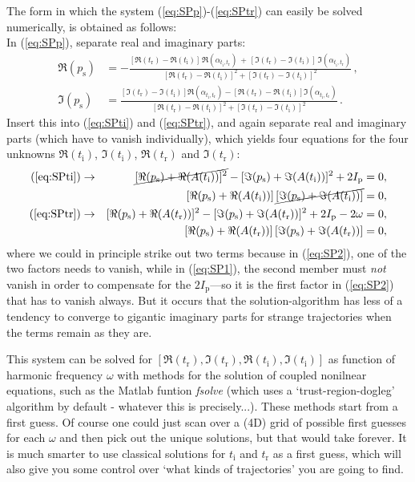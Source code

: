 \documentclass[10pt]{article}
\newcommand{\rmi}{\mathrm i}
\newcommand{\ti}{t_\rmi}
\newcommand{\tr}{t_\mathrm{r}}
\newcommand{\Ip}{I_{\mathrm p}}
\newcommand{\ps}{p_{\mathrm s}}
\begin{document}
The form in which the system (\ref{eq:SPp})-(\ref{eq:SPtr}) can easily be solved numerically, is obtained as follows:\\
In (\ref{eq:SPp}), separate real and imaginary parts:
\begin{align}
	\Re(\ps)& = -\frac{[\Re(\tr)-\Re(\ti)]\,\Re(\alpha_{\ti,\tr}) \,+\, [\Im(\tr)-\Im(\ti)]\,\Im(\alpha_{\ti,\tr})}{[\Re(\tr)-\Re(\ti)]^2+[\Im(\tr)-\Im(\ti)]^2}\, , \\
	\Im(\ps)& = \frac{[\Im(\tr)-\Im(\ti)]\Re(\alpha_{\ti,\tr}) - [\Re(\tr)-\Re(\ti)]\Im(\alpha_{\ti,\tr})}{[\Re(\tr)-\Re(\ti)]^2+[\Im(\tr)-\Im(\ti)]^2}\, .
\end{align}
Insert this  into (\ref{eq:SPti}) and (\ref{eq:SPtr}), and again separate real and imaginary parts (which have to vanish individually), which yields four equations for the four unknowns $\Re(\ti)$, $\Im(\ti)$, $\Re(\tr)$ and $\Im(\tr)$:
\begin{align}
	\text{(\ref{eq:SPti})} \rightarrow&&   \cancel{[\Re(\ps) + \Re(A(\ti))]^2} -  [\Im(\ps) + \Im(A(\ti))]^2 +2\Ip& = 0, \label{eq:SP1} \\
					     &&   [\Re(\ps) + \Re(A(\ti))]\, \cancel{[\Im(\ps) + \Im(A(\ti))]}& = 0,  \label{eq:SP2} \\
 	\text{(\ref{eq:SPtr})}\rightarrow&&     [\Re(\ps) + \Re(A(\tr))]^2 -  [\Im(\ps) + \Im(A(\tr))]^2 +2\Ip - 2\omega& = 0,  \label{eq:SP3} \\
					     &&  [\Re(\ps) + \Re(A(\tr))]\, [\Im(\ps) + \Im(A(\tr))]& = 0, \label{eq:SP4} 
\end{align}
where we could in principle strike out two terms because in (\ref{eq:SP2}), one of the two factors needs to vanish, while in (\ref{eq:SP1}), the second member must \emph{not} vanish in order to compensate for the $2\Ip$---so it is the first factor in (\ref{eq:SP2}) that has to vanish always. But it occurs that the solution-algorithm has less of a tendency to converge to gigantic imaginary parts for strange trajectories when the terms remain as they are.

This system can be solved for $[\Re(\tr), \Im(\tr), \Re(\ti), \Im(\ti)]$ as function of harmonic frequency $\omega$ with methods for the solution of coupled nonilnear equations, such as the Matlab funtion \emph{fsolve} (which uses a `trust-region-dogleg' algorithm by default - whatever this is precisely...). These methods start from a first guess. Of course one could just scan over a (4D) grid of possible first guesses for each $\omega$ and then pick out the unique solutions, but that would take forever. It is much smarter to use classical solutions for $\ti$ and $\tr$ as a first guess, which will also give you some control over `what kinds of trajectories' you are going to find.



%


\end{document}
